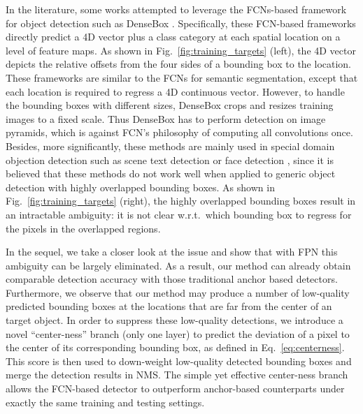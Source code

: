 \documentclass[10pt,twocolumn,letterpaper]{article}
\newcommand{\1}{{\mathbbm{1}}}           %
\begin{document}
In the literature, %
some works attempted  to leverage the  FCNs-based framework for object detection such as DenseBox \cite{huang2015densebox}. Specifically, these FCN-based frameworks directly predict a 4D vector plus a class category at each spatial location on a level of feature maps. As shown in  Fig.~\ref{fig:training_targets} (left), the 4D vector depicts the relative offsets from the four sides of a bounding box to the location. These frameworks are  similar to the FCNs for semantic segmentation, except that each location is required to regress a 4D continuous vector.
%
However, to handle the bounding boxes with different sizes, DenseBox \cite{huang2015densebox} crops and resizes training images to a fixed scale. Thus DenseBox has to perform detection on image pyramids,
which is against FCN's philosophy of computing all convolutions once. 
%
Besides, 
%
more significantly, 
these methods %
are mainly used in special domain objection detection such as scene text detection \cite{zhou2017east, he2018end} or face detection \cite{yu2016unitbox, huang2015densebox}, 
since it is believed that these methods 
%
%
do not work well when applied to
generic object detection with highly overlapped bounding boxes. As shown in  Fig.~\ref{fig:training_targets} (right), the highly overlapped 
bounding boxes result in an intractable ambiguity:
%
it is not clear w.r.t.\ which bounding box to regress for the pixels in the overlapped regions.  

In the sequel, we take a closer look at the issue and show that with FPN this ambiguity can be largely eliminated. 
%
%
%
%
%
%
%
As a result, our method can already obtain comparable detection accuracy with those traditional anchor based detectors.
%
%
Furthermore, we %
observe that 
%
 our method 
%
may produce a number of low-quality predicted bounding boxes 
%
at the locations that are far from the center of an target object.   
%
In order to suppress these low-quality detections,  we introduce a novel ``center-ness''  branch (only one layer) to
%
predict the deviation of a pixel to the center of its corresponding bounding box, as defined in Eq.~\eqref{eq:centerness}.
%
This score is then used to down-weight low-quality detected bounding boxes and merge the detection results in NMS. The simple yet effective center-ness branch allows the FCN-based detector to outperform anchor-based counterparts under exactly the same training and testing settings.
\end{document}
